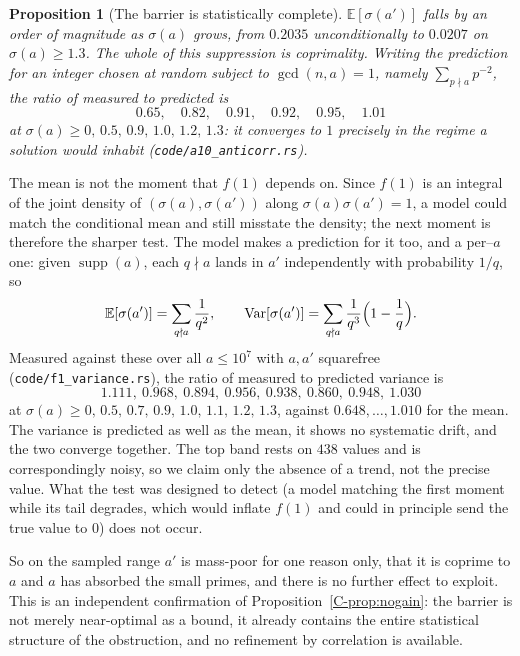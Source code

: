 \documentclass[11pt]{article}
\newtheorem{proposition}[theorem]{Proposition}
\theoremstyle{definition}
\begin{document}
\begin{proposition}[The barrier is statistically complete]\label{prop:anticorr}
$\mathbb{E}[\sigma(a')]$ falls by an order of magnitude as $\sigma(a)$ grows, from $0.2035$
unconditionally to $0.0207$ on $\sigma(a)\ge1.3$. The whole of this suppression is coprimality.
Writing the prediction for an integer chosen at random subject to $\gcd(n,a)=1$, namely
$\sum_{p\nmid a}p^{-2}$, the ratio of measured to predicted is
\[ 0.65,\quad 0.82,\quad 0.91,\quad 0.92,\quad 0.95,\quad 1.01 \]
at $\sigma(a)\ge0,\,0.5,\,0.9,\,1.0,\,1.2,\,1.3$: it converges to $1$ precisely in the regime a
solution would inhabit \textup{(\texttt{code/a10\_anticorr.rs})}.
\end{proposition}

The mean is not the moment that $f(1)$ depends on. Since $f(1)$ is an integral of the joint density
of $(\sigma(a),\sigma(a'))$ along $\sigma(a)\sigma(a')=1$, a model could match the conditional mean
and still misstate the density; the next moment is therefore the sharper test. The model makes a
prediction for it too, and a per--$a$ one: given $\operatorname{supp}(a)$, each $q\nmid a$ lands in
$a'$ independently with probability $1/q$, so
\[ \mathbb{E}[\sigma(a')]=\sum_{q\nmid a}\frac1{q^{2}},\qquad
   \operatorname{Var}[\sigma(a')]=\sum_{q\nmid a}\frac1{q^{3}}\Bigl(1-\frac1q\Bigr). \]
Measured against these over all $a\le10^{7}$ with $a,a'$ squarefree
\textup{(\texttt{code/f1\_variance.rs})}, the ratio of measured to predicted variance is
\[ 1.111,\ 0.968,\ 0.894,\ 0.956,\ 0.938,\ 0.860,\ 0.948,\ 1.030 \]
at $\sigma(a)\ge0,\,0.5,\,0.7,\,0.9,\,1.0,\,1.1,\,1.2,\,1.3$, against $0.648,\dots,1.010$ for the
mean. The variance is predicted as well as the mean, it shows no systematic drift, and the two
converge together. The top band rests on $438$ values and is correspondingly noisy, so we claim only
the absence of a trend, not the precise value. What the test was designed to detect (a model
matching the first moment while its tail degrades, which would inflate $f(1)$ and could in principle
send the true value to $0$) does not occur.

So on the sampled range $a'$ is mass-poor for one reason only, that it is coprime to $a$ and $a$ has
absorbed the small primes, and there is no further effect to exploit. This is an independent
confirmation of Proposition~\ref{C-prop:nogain}: the barrier is not merely near-optimal as a bound, it
already contains the entire statistical structure of the obstruction, and no refinement by
correlation is available.
\end{document}
